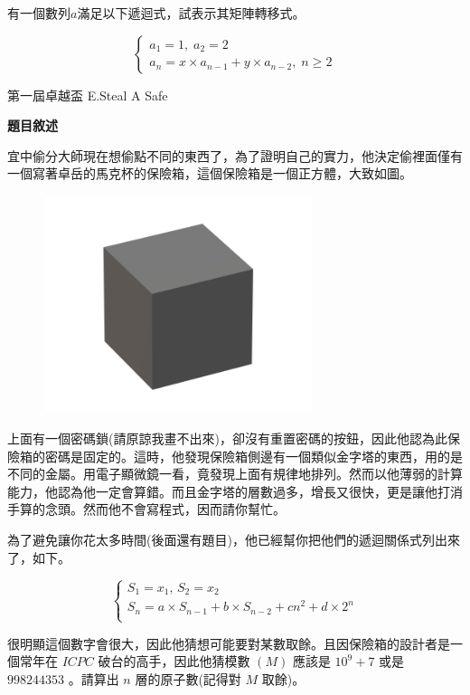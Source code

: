     \problem 有一個數列$a$滿足以下遞迴式，試表示其矩陣轉移式。

    $$
    \begin{cases}
        a_1=1, \; a_2=2 \\
        a_n=x \times a_{n-1} + y \times a_{n-2}, \; n \ge 2
    \end{cases}
    $$

    \problem 第一屆卓越盃 E.Steal A Safe

    \textbf{題目敘述}

    宜中偷分大師現在想偷點不同的東西了，為了證明自己的實力，他決定偷裡面僅有一個寫著卓岳的馬克杯的保險箱，這個保險箱是一個正方體，大致如圖。

    \begin{figure}[h]
        \centering
        \includegraphics[width=0.7\textwidth]{../Images/StealASafe.png}
    \end{figure}

    上面有一個密碼鎖(請原諒我畫不出來)，卻沒有重置密碼的按鈕，因此他認為此保險箱的密碼是固定的。這時，他發現保險箱側邊有一個類似金字塔的東西，用的是不同的金屬。用電子顯微鏡一看，竟發現上面有規律地排列。然而以他薄弱的計算能力，他認為他一定會算錯。而且金字塔的層數過多，增長又很快，更是讓他打消手算的念頭。然而他不會寫程式，因而請你幫忙。

    為了避免讓你花太多時間(後面還有題目)，他已經幫你把他們的遞迴關係式列出來了，如下。

    $$
    \begin{cases}
    S_1=x_1, \, S_2=x_2\\
    S_n=a \times S_{n-1} + b \times S_{n-2} + cn^2 + d \times 2^n\\
    \end{cases}
    $$

    很明顯這個數字會很大，因此他猜想可能要對某數取餘。且因保險箱的設計者是一個常年在 $ICPC$ 破台的高手，因此他猜模數 $(M)$ 應該是 $10^9+7$ 或是 $998244353$ 。請算出 $n$ 層的原子數(記得對 $M$ 取餘)。

